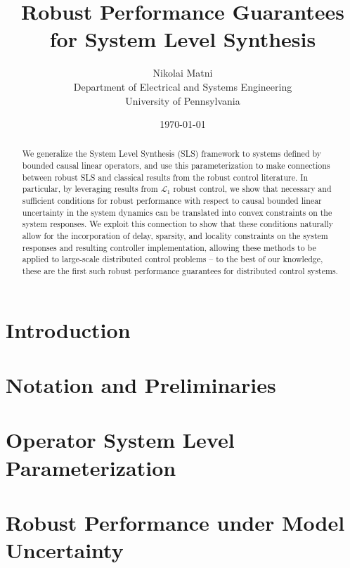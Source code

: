 \documentclass[11pt]{article}
\title{Robust Performance Guarantees for System Level Synthesis}
\author{Nikolai Matni
\vspace{0.0625in}
\\
Department of Electrical and Systems Engineering\\
University of Pennsylvania}
\date{\today}
\numberwithin{theorem}{section}
\numberwithin{equation}{section}
\begin{document}
\maketitle
\begin{abstract}
We generalize the System Level Synthesis (SLS) framework to systems defined by bounded causal linear operators, and use this parameterization to make connections between robust SLS and classical results from the robust control literature.  In particular, by leveraging results from $\mathcal{L}_1$ robust control, we show that necessary and sufficient conditions for robust performance with respect to causal bounded linear uncertainty in the system dynamics can be translated into convex constraints on the system responses.  We exploit this connection to show that these conditions naturally allow for the incorporation of delay, sparsity, and locality constraints on the system responses and resulting controller implementation, allowing these methods to be applied to large-scale distributed control problems -- to the best of our knowledge, these are the first such robust performance guarantees for distributed control systems.  %
\end{abstract}

\section{Introduction}
\label{sec:introduction}


\section{Notation and Preliminaries}
\label{sec:notation}


\section{Operator System Level Parameterization}
\label{sec:operator}


\section{Robust Performance under Model Uncertainty}
\label{sec:robust-perf}

\end{document}
